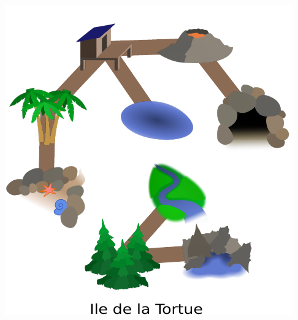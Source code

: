 \documentclass[french, landscape]{article}
\begin{document}
\newpage\includegraphics[height=\textheight]{iles/svgs/verification_et-mod/tortue.pdf}
\end{document}
